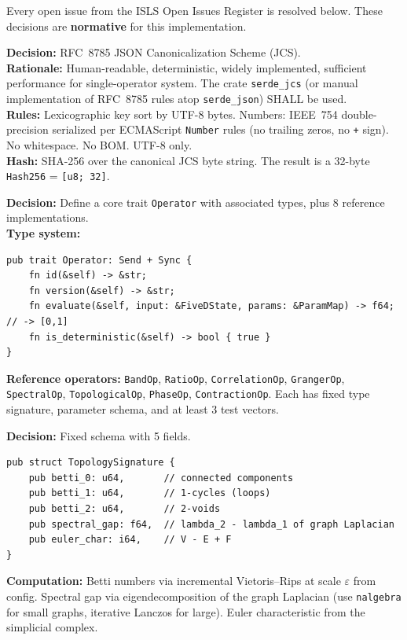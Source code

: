 \documentclass[10pt,a4paper]{article}
\theoremstyle{definition}\newtheorem{definition}{Def}[section]
\theoremstyle{plain}\newtheorem{theorem}{Thm}[section]
\newcommand{\ty}[1]{\texttt{\small\color{accent}#1}}
\begin{document}
Every open issue from the ISLS Open Issues Register is resolved below. These decisions are \textbf{normative} for this implementation.

\begin{resolvebox}
\textbf{Decision:} RFC~8785 JSON Canonicalization Scheme (JCS).\\
\textbf{Rationale:} Human-readable, deterministic, widely implemented, sufficient performance for single-operator system. The crate \texttt{serde\_jcs} (or manual implementation of RFC~8785 rules atop \texttt{serde\_json}) SHALL be used.\\
\textbf{Rules:} Lexicographic key sort by UTF-8 bytes. Numbers: IEEE~754 double-precision serialized per ECMAScript \texttt{Number} rules (no trailing zeros, no \texttt{+} sign). No whitespace. No BOM. UTF-8 only.\\
\textbf{Hash:} SHA-256 over the canonical JCS byte string. The result is a 32-byte \ty{Hash256} = \texttt{[u8; 32]}.
\end{resolvebox}

\begin{resolvebox}
\textbf{Decision:} Define a core trait \ty{Operator} with associated types, plus 8 reference implementations.\\
\textbf{Type system:}
\begin{lstlisting}[style=rust]
pub trait Operator: Send + Sync {
    fn id(&self) -> &str;
    fn version(&self) -> &str;
    fn evaluate(&self, input: &FiveDState, params: &ParamMap) -> f64; // -> [0,1]
    fn is_deterministic(&self) -> bool { true }
}
\end{lstlisting}
\textbf{Reference operators:} \texttt{BandOp}, \texttt{RatioOp}, \texttt{CorrelationOp}, \texttt{GrangerOp}, \texttt{SpectralOp}, \texttt{TopologicalOp}, \texttt{PhaseOp}, \texttt{ContractionOp}. Each has fixed type signature, parameter schema, and at least 3 test vectors.
\end{resolvebox}

\begin{resolvebox}
\textbf{Decision:} Fixed schema with 5 fields.
\begin{lstlisting}[style=rust]
pub struct TopologySignature {
    pub betti_0: u64,       // connected components
    pub betti_1: u64,       // 1-cycles (loops)
    pub betti_2: u64,       // 2-voids
    pub spectral_gap: f64,  // lambda_2 - lambda_1 of graph Laplacian
    pub euler_char: i64,    // V - E + F
}
\end{lstlisting}
\textbf{Computation:} Betti numbers via incremental Vietoris--Rips at scale $\varepsilon$ from config. Spectral gap via eigendecomposition of the graph Laplacian (use \texttt{nalgebra} for small graphs, iterative Lanczos for large). Euler characteristic from the simplicial complex.
\end{resolvebox}
\end{document}
